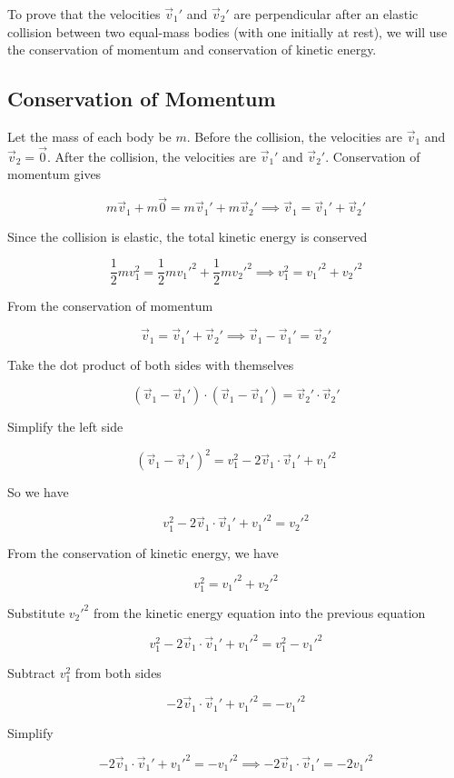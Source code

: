 \documentclass[12pt]{article}
\begin{document}
To prove that the velocities $\vec{v}_1'$ and $\vec{v}_2'$ are perpendicular after an elastic collision between two equal-mass bodies (with one initially at rest), we will use the conservation of momentum and conservation of kinetic energy.

\subsection*{Conservation of Momentum}

Let the mass of each body be $m$. Before the collision, the velocities are $\vec{v}_1$ and $\vec{v}_2 = \vec{0}$. After the collision, the velocities are $\vec{v}_1'$ and $\vec{v}_2'$. Conservation of momentum gives

\[
m\vec{v}_1 + m\vec{0} = m\vec{v}_1' + m\vec{v}_2' \implies \vec{v}_1 = \vec{v}_1' + \vec{v}_2'
\]


Since the collision is elastic, the total kinetic energy is conserved

\[
\frac{1}{2} m v_1^2 = \frac{1}{2} m {v_1'}^2 + \frac{1}{2} m {v_2'}^2 \implies v_1^2 = {v_1'}^2 + {v_2'}^2
\]


From the conservation of momentum

\[
\vec{v}_1 = \vec{v}_1' + \vec{v}_2' \implies \vec{v}_1 - \vec{v}_1' = \vec{v}_2'
\]

Take the dot product of both sides with themselves

\[
(\vec{v}_1 - \vec{v}_1') \cdot (\vec{v}_1 - \vec{v}_1') = \vec{v}_2' \cdot \vec{v}_2'
\]

Simplify the left side

\[
(\vec{v}_1 - \vec{v}_1')^2 = v_1^2 - 2\vec{v}_1 \cdot \vec{v}_1' + {v_1'}^2
\]

So we have

\[
v_1^2 - 2\vec{v}_1 \cdot \vec{v}_1' + {v_1'}^2 = {v_2'}^2
\]

From the conservation of kinetic energy, we have

\[
v_1^2 = {v_1'}^2 + {v_2'}^2
\]

Substitute ${v_2'}^2$ from the kinetic energy equation into the previous equation

\[
v_1^2 - 2\vec{v}_1 \cdot \vec{v}_1' + {v_1'}^2 = v_1^2 - {v_1'}^2
\]

Subtract $v_1^2$ from both sides

\[
-2\vec{v}_1 \cdot \vec{v}_1' + {v_1'}^2 = -{v_1'}^2
\]

Simplify

\[
-2\vec{v}_1 \cdot \vec{v}_1' + {v_1'}^2 = -{v_1'}^2 \implies -2\vec{v}_1 \cdot \vec{v}_1' = -2{v_1'}^2
\]
\end{document}
